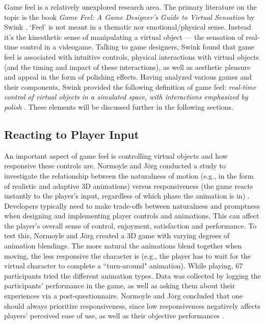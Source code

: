 
Game feel is a relatively unexplored research area. The primary literature on the topic is the book \textit{Game Feel: A Game Designer's Guide to Virtual Sensation} by Swink \cite{swink}. `Feel' is not meant in a thematic nor emotional/physical sense. Instead it's the kinesthetic sense of manipulating a virtual object --- the sensation of real-time control in a videogame. Talking to game designers, Swink found that game feel is associated with intuitive controls, physical interactions with virtual objects (and the timing and impact of these interactions), as well as aesthetic pleasure and appeal in the form of polishing effects. Having analyzed various games and their components, Swink provided the following definition of game feel: \textit{real-time control of virtual objects in a simulated space, with interactions emphasized by polish} \cite{swink}. These elements will be discussed further in the following sections.

\subsection{Reacting to Player Input}
An important aspect of game feel is controlling virtual objects and how responsive these controls are. Normoyle and J\"{o}rg conducted a study to investigate the relationship between the naturalness of motion (e.g., in the form of realistic and adaptive 3D animations) versus responsiveness (the game reacts instantly to the player's input, regardless of which phase the animation is in) \cite{normoyle_trade-offs_2014}. Developers typically need to make trade-offs between naturalness and promptness when designing and implementing player controls and animations. This can affect the player's overall sense of control, enjoyment, satisfaction and performance. To test this, Normoyle and J\"{o}rg  created a 3D game with varying degrees of animation blendings. The more natural the animations blend together when moving, the less responsive the character is (e.g., the player has to wait for the virtual character to complete a ``turn-around" animation). While playing, 67 participants tried the different animation types.  Data was collected by logging the participants' performance in the game, as well as asking them about their experiences via a post-questionnaire. Normoyle and J\"{o}rg concluded that one should always prioritize responsiveness, since low responsiveness negatively affects players' perceived ease of use, as well as their objective performances \cite{normoyle_trade-offs_2014}.

